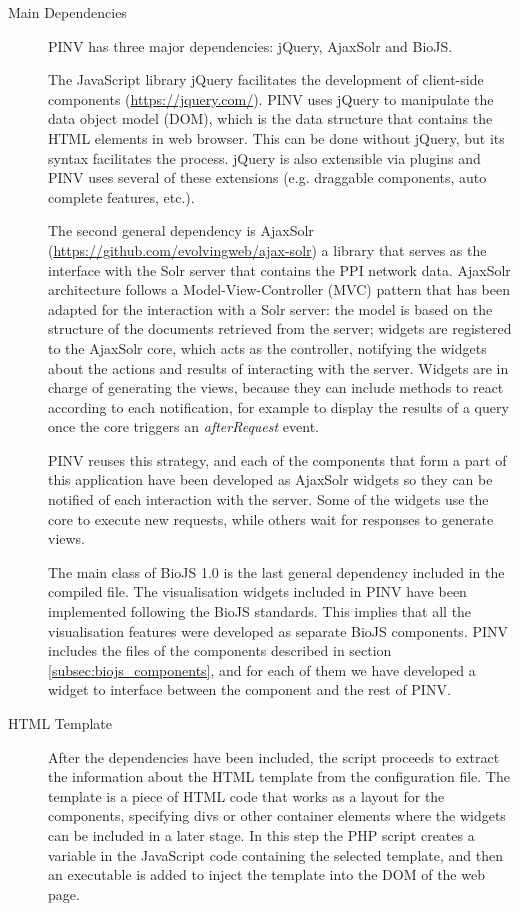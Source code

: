 \begin{description}
\item[Main Dependencies] 
PINV has three major dependencies: jQuery, AjaxSolr and BioJS. 

The JavaScript library jQuery  facilitates the development of client-side components (\url{https://jquery.com/}). PINV uses jQuery to manipulate the data object model (DOM), which is the data structure that contains the HTML elements in web browser. This can be done without jQuery, but its syntax facilitates the process. jQuery is also extensible via plugins and PINV uses several of these extensions (e.g. draggable components, auto complete features, etc.).

The second general dependency is AjaxSolr (\url{https://github.com/evolvingweb/ajax-solr}) a library that serves as the interface with the Solr server that contains the PPI network data. AjaxSolr architecture follows a Model-View-Controller (MVC) pattern that has been adapted for the interaction with a Solr server: the model is based on the structure of the documents retrieved from the server; widgets are registered to the AjaxSolr core, which acts as the controller, notifying the widgets about the actions and results of interacting with the server. Widgets are in charge of generating the views, because they can include methods to react according to each notification, for example to display the results of a query once the core triggers an \emph{afterRequest} event. 

PINV reuses this strategy, and each of the components that form a part of this application have been developed as AjaxSolr widgets so they can be notified of each interaction with the server. Some of the widgets use the core to execute new requests, while others wait for responses to generate views.

The main class of BioJS 1.0 is the last general dependency included in the compiled file. The visualisation widgets included in PINV have been implemented following the BioJS standards. This implies that all the visualisation features were developed as separate BioJS components. PINV includes the files of the components described in section \ref{subsec:biojs_components}, and for each of them we have developed a widget to interface between the component and the rest of PINV.

\item[HTML Template]
After the dependencies have been included, the script proceeds to extract the information about the HTML template from the configuration file. The template is a piece of HTML code that works as a layout for the components, specifying divs or other container elements where the widgets can be included in a later stage. In this step the PHP script creates a variable in the JavaScript code containing the selected template, and then an executable is added to inject the template into the DOM of the web page.


\end{description}
